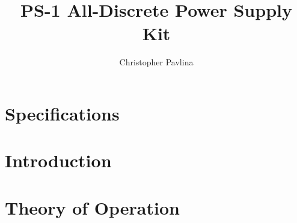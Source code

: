 \documentclass{book}
\title{PS-1 All-Discrete Power Supply Kit}
\author{Christopher Pavlina}
\begin{document}
\frontmatter




\chapter{Specifications}


\tableofcontents

\mainmatter

\chapter{Introduction}


\chapter{Theory of Operation}









%
\end{document}

